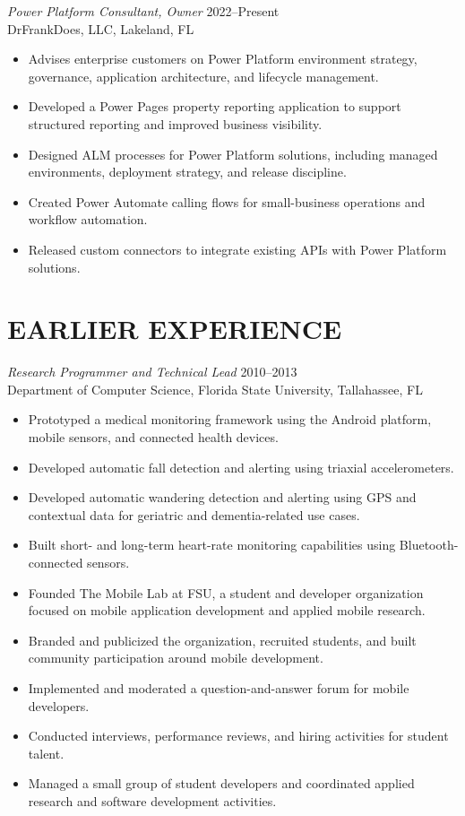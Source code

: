 \documentclass[margin]{res}
\begin{document}
\begin{resume}
{\sl Power Platform Consultant, Owner} \hfill 2022--Present\\
DrFrankDoes, LLC, Lakeland, FL
\begin{itemize}
\item Advises enterprise customers on Power Platform environment strategy, governance, application architecture, and lifecycle management.
\item Developed a Power Pages property reporting application to support structured reporting and improved business visibility.
\item Designed ALM processes for Power Platform solutions, including managed environments, deployment strategy, and release discipline.
\item Created Power Automate calling flows for small-business operations and workflow automation.
\item Released custom connectors to integrate existing APIs with Power Platform solutions.
\end{itemize}

\section{EARLIER EXPERIENCE}

{\sl Research Programmer and Technical Lead} \hfill 2010--2013\\
Department of Computer Science, Florida State University, Tallahassee, FL
\begin{itemize}
\item Prototyped a medical monitoring framework using the Android platform, mobile sensors, and connected health devices.
\item Developed automatic fall detection and alerting using triaxial accelerometers.
\item Developed automatic wandering detection and alerting using GPS and contextual data for geriatric and dementia-related use cases.
\item Built short- and long-term heart-rate monitoring capabilities using Bluetooth-connected sensors.
\item Founded The Mobile Lab at FSU, a student and developer organization focused on mobile application development and applied mobile research.
\item Branded and publicized the organization, recruited students, and built community participation around mobile development.
\item Implemented and moderated a question-and-answer forum for mobile developers.
\item Conducted interviews, performance reviews, and hiring activities for student talent.
\item Managed a small group of student developers and coordinated applied research and software development activities.
\end{itemize}


\end{resume}
\end{document}
